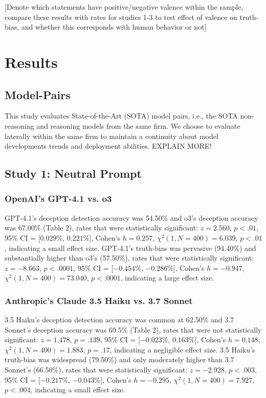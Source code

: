 \documentclass{article}
\begin{document}
[Denote which statements have positive/negative valence within the sample, compare these results with rates for studies 1-3 to test effect of valence on truth-bias, and whether this corresponds with human behavior or not]

\section{Results}

\subsection{Model-Pairs}

This study evaluates State-of-the-Art (SOTA) model pairs, i.e., the SOTA non-reasoning and reasoning models from the same firm. We choose to evaluate laterally within the same firm to maintain a continuity about model developments trends and deployment abilities. EXPLAIN MORE!

\subsection{Study 1: Neutral Prompt}

\subsubsection{OpenAI's GPT-4.1 vs. o3}

GPT-4.1's deception detection accuracy was 54.50\% and o3's deception accuracy was 67.00\% (Table 2), rates that were statistically significant:  $z = 2.560$, $p < .01$, 95\% CI = [$0.029\%$, $0.221\%$], Cohen’s $h =0.257$, $\chi^2(1, N = 400) = 6.039$, $p < .01$, indicating a small effect size. GPT-4.1's truth-bias was pervasive (94.40\%) and substantially higher than o3's (57.50\%), rates that were statistically significant: $z = -8.663$, $p < .0001$, 95\% CI = [$-0.454\%$, $-0.286\%$], Cohen’s $h = -0.947$, $\chi^2(1, N = 400) = 73.040$, $p < .0001$, indicating a large effect size.

\subsubsection{Anthropic's Claude 3.5 Haiku vs. 3.7 Sonnet}

3.5 Haiku's deception detection accuracy was common at 62.50\% and 3.7 Sonnet's deception accuracy was 69.5\% (Table 2), rates that were not statistically significant:  $z = 1.478$, $p = .139$, 95\% CI = [$-0.023\%$, $0.163\%$], Cohen’s $h =0.148$, $\chi^2(1, N = 400) = 1.883$, $p = .17$, indicating a negligible effect size. 3.5 Haiku's truth-bias was widespread (79.50\%) and only moderately higher than 3.7 Sonnet's (66.50\%), rates that were statistically significant: $z = -2.928$, $p < .003$, 95\% CI = [$-0.217\%$, $-0.043\%$], Cohen’s $h = -0.295$, $\chi^2(1, N = 400) = 7.927$, $p < .004$, indicating a small effect size.
\end{document}
